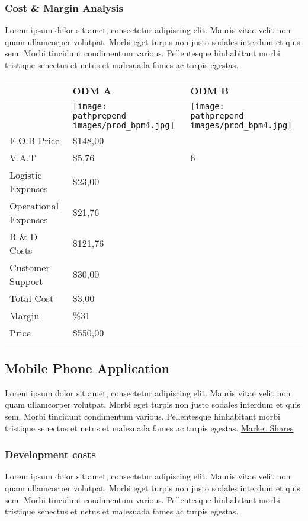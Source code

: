 \documentclass[11pt]{article}
\def\pathprepend{}%
\def\pathprepend{business_plan/}%
\begin{document}
\subsubsection{Cost \& Margin Analysis}
Lorem ipsum dolor sit amet, consectetur adipiscing elit. Mauris vitae velit
non quam ullamcorper volutpat. Morbi eget turpis non justo sodales interdum
et quis sem. Morbi tincidunt condimentum various. Pellentesque hinhabitant morbi
tristique senectus et netus et malesuada fames ac turpis egestas.\newline
\begin{tabular}{ | l | l | l | }\hline
  & ODM A & ODM B \\ \hline
  & \texttt{[image: \\pathprepend images/prod\_bpm4.jpg]} & \texttt{[image: \\pathprepend images/prod\_bpm4.jpg]} \\ \hline
  F.O.B Price & \$148,00 &  \\ \hline
  V.A.T & \$5,76 & 6 \\ \hline
  Logistic Expenses & \$23,00 &  \\ \hline
  Operational Expenses & \$21,76 &  \\ \hline
  R \& D Costs & \$121,76 &  \\ \hline
  Customer Support & \$30,00 &  \\ \hline
  Total Cost & \$3,00 &  \\ \hline
  Margin & \%31 &  \\ \hline
  Price & \$550,00 &  \\ \hline
\end{tabular}
\pagebreak

\subsection{Mobile Phone Application}
Lorem ipsum dolor sit amet, consectetur adipiscing elit. Mauris vitae velit
non quam ullamcorper volutpat. Morbi eget turpis non justo sodales interdum
et quis sem. Morbi tincidunt condimentum various. Pellentesque hinhabitant morbi
tristique senectus et netus et malesuada fames ac turpis egestas.\newline
\hyperlink{market_share}{Market Shares}

\subsubsection{Development costs}
Lorem ipsum dolor sit amet, consectetur adipiscing elit. Mauris vitae velit
non quam ullamcorper volutpat. Morbi eget turpis non justo sodales interdum
et quis sem. Morbi tincidunt condimentum various. Pellentesque hinhabitant morbi
tristique senectus et netus et malesuada fames ac turpis egestas.\newline
\end{document}
